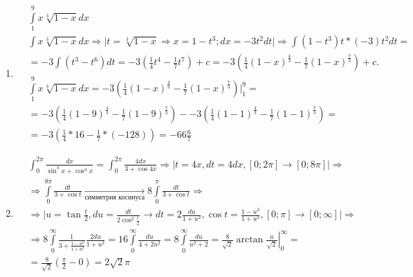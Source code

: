 \documentclass[a4paper, 12pt]{article}
\begin{document}
\begin{enumerate}
\item %
\begin{align*}
    &\int\limits_1^9x\sqrt[3]{1-x}dx \\
    &\int x\sqrt[3]{1-x}dx \Rightarrow \Big| t = \sqrt[3]{1-x} \Rightarrow x = 1-t^3; dx = -3t^2dt \Big| \Rightarrow 
    \int{(1-t^3)t*(-3)t^2dt} = \\
    &= -3\int(t^3-t^6)dt = -3(\frac{1}{4}t^4 - \frac{1}{7}t^7)+c = 
    -3\left(\frac{1}{4}(1-x)^\frac{4}{3} - \frac{1}{7}(1-x)^\frac{7}{3}\right)+c .\\
    & \int\limits_1^9x\sqrt[3]{1-x}dx = 
    -3\left(\frac{1}{4}(1-x)^\frac{4}{3} - \frac{1}{7}(1-x)^\frac{7}{3}\right)\Big|_1^9 = \\
    &= -3\left(\frac{1}{4}(1-9)^\frac{4}{3} - \frac{1}{7}(1-9)^\frac{7}{3}\right) - 
    -3\left(\frac{1}{4}(1-1)^\frac{4}{3} - \frac{1}{7}(1-1)^\frac{7}{3}\right) = \\
    &= -3\left(\frac{1}{4}*16 - \frac{1}{7}*(-128)\right) = 
    -66\frac{6}{7}
    \end{align*}
    
    \item %
    \begin{align*}
     &\int_{0}^{2\pi} \frac{dx}{\sin ^4x+\cos ^4x} 
  = \int_{0}^{2\pi} \frac{4dx}{3+\cos 4x} \Rightarrow
  \Big| t = 4x, dt=4dx, [0;2\pi] \to [0;8\pi] \Big| \Rightarrow \\
  &\Rightarrow \int\limits_0^{8\pi} \frac{dt}{3+\cos t} \xrightarrow[\text{симметрия косинуса}]{}
  8\int\limits_0^{\pi} \frac{dt}{3+\cos t}\Rightarrow \\
  &\Rightarrow\Big| u = \tan \frac{t}{2}, du = \frac{dt}{2\cos^2\frac{t}{2}} \to dt = 2\frac{du}{1+u^2}, \cos t = \frac{1-u^2}{1+u^2}, [0;\pi] \to [0;\infty] \Big| \Rightarrow \\
  &\Rightarrow 8\int\limits_0^\infty \frac{1}{3+\frac{1-u^2}{1+u^2}}\frac{2du}{1+u^2} = 
  16\int\limits_0^\infty \frac{du}{4+2u^2} = 8\int\limits_0^\infty \frac{du}{u^2 +2} = 
  \left.\frac{8}{\sqrt{2}}\arctan \frac{u}{\sqrt{2}}\right|_0^\infty = \\
  &= \frac{8}{\sqrt{2}}\left(\frac{\pi}{2} - 0\right) = 2\sqrt{2}\pi
    \end{align*}


\end{enumerate}
\end{document}
